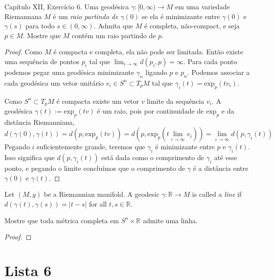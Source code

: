 \begin{exercise}
\label{exercise-l5-5}
\cite{doc} Capítulo XII, Exercício 6. Uma geodésica $\gamma:[0,\infty)\to M$ em
uma variedade Riemannana $M$ é um {\it raio partindo de $\gamma(0)$} se ela é
minimizante entre $\gamma(0)$ e $\gamma(s)$ para todo  $s \in (0,\infty)$.
Admita que $M$ é completa, não-compact, e seja $p \in M$. Mostre que $M$ contém
um raio partindo de $p$.
\end{exercise}

\begin{proof}
Como $M$ é compacta e completa, ela não pode ser limitada. Então
existe uma sequência de pontos $p_i$  tal que $\lim_{i \to \infty}
d(p_i,p)=\infty$. Para cada ponto podemos pegar uma geodésica minimizante
$\gamma_n$ ligando $p$ e $p_n$. Podemos associar a cada geodésica um vetor
unitário $v_i \in S^n \subset T_pM$ tal que $\gamma_i(t)=\text{exp}_p(tv_i)$.

Como $S^n \subset T_pM$ é compacta existe um vetor $v$ limite da sequência
$v_i$. A geodésica $\gamma(t):=\text{exp}_p(tv)$ é um raio, pois por
continuidade de $\text{exp}_p$ e da distância Riemanniana,
$$
d(\gamma(0),\gamma(t))=d\left(p,\text{exp}_p(tv)\right)
=d\left(p,\text{exp}_p\left(t\lim_{i \to \infty} v_i\right)\right)
=\lim_{i \to \infty} d(p,\gamma_i (t))
$$
Pegando $i$ suficientemente grande, teremos que $\gamma_i$ é minimizante entre
$p$ e $\gamma_i(t)$. Isso significa que $d(p,\gamma_i(t))$ está dada como o
comprimento de $\gamma_i$ até esse ponto, e pegando o limite concluímos que o
comprimento de $\gamma$ é a distância entre $\gamma(0)$ e $\gamma(t)$.
\end{proof}

\begin{definition}
\label{definition-line-riemannian-manifold}
Let $(M,g)$ be a Riemannian manifold. A geodesic $\gamma:\mathbb{R} \to M$ is
called a {\it line} if $d(\gamma(t),\gamma(s))=|t-s|$ for all $t,s \in
\mathbb{R}$.
\end{definition}

\begin{exercise}
\label{exercise-l5-6}
Mostre que toda métrica completa em $S^n \times \mathbb{R}$ admite uma linha.
\end{exercise}

\begin{proof}

\end{proof}

\section{Lista 6}
\label{section-lista-6}

